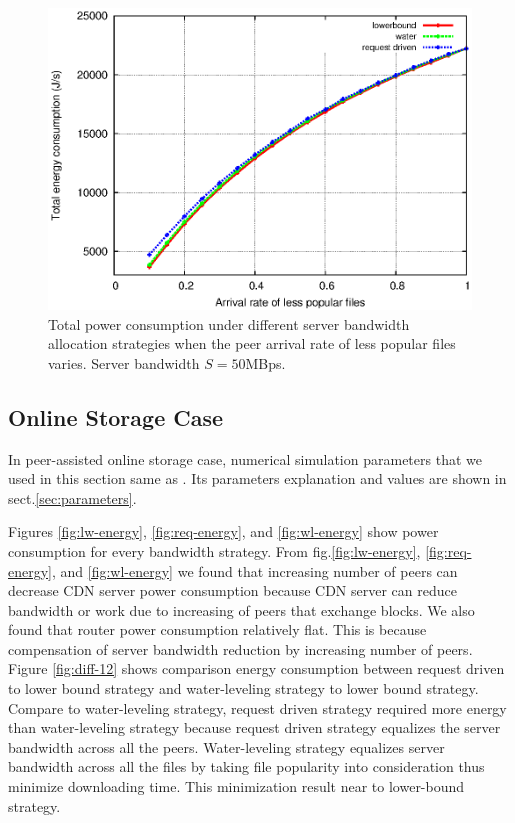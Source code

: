 \documentclass[conference]{IEEEtran}
\begin{document}
\begin{figure}[htp!]
\hfill
\centering
\begin{minipage}[b]{0.3\linewidth}
	\includegraphics[scale=0.4]{graphs/totalconsumption.eps}
	\caption{Total power consumption under different server bandwidth allocation strategies when the peer arrival rate of less popular files varies. Server bandwidth $S=50$MBps.}
	\label{fig:totalpop}
\end{minipage}
\label{fig:popularity}
\end{figure}


\subsection{Online Storage Case}\label{subsec:onlinestorage}

In peer-assisted online storage case, numerical simulation parameters that we used in this section same as \cite{Sun:2009:POS:1542245.1542249}.
Its parameters explanation and values are shown in sect.\ref{sec:parameters}.

Figures \ref{fig:lw-energy}, \ref{fig:req-energy}, and \ref{fig:wl-energy} show power consumption for every bandwidth strategy.
From fig.\ref{fig:lw-energy}, \ref{fig:req-energy}, and \ref{fig:wl-energy} we found that increasing number of peers can decrease CDN server power consumption because CDN server can reduce bandwidth or work due to increasing of peers that exchange blocks. 
We also found that router power consumption relatively flat. 
This is because compensation of server bandwidth reduction by increasing number of peers.  
Figure \ref{fig:diff-12} shows comparison energy consumption between request driven to lower bound strategy and water-leveling strategy to lower bound strategy.  
Compare to water-leveling strategy, request driven strategy required more energy than water-leveling strategy because request driven strategy equalizes the server bandwidth across all the peers.
Water-leveling strategy equalizes server bandwidth across all the files by taking file popularity into consideration thus minimize downloading time. 
This minimization result near to lower-bound strategy.  
\end{document}
